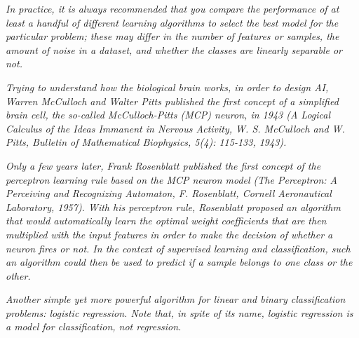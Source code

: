 \textit{In practice, it is always recommended that you compare the performance of at least a handful of different learning algorithms to select the best model for the particular problem; these may differ in the number of features or samples, the amount of noise in a dataset, and whether the classes are linearly separable or not.}

\textit{Trying to understand how the biological brain works, in order to design AI, Warren McCulloch and Walter Pitts published the first concept of a simplified brain cell, the so-called McCulloch-Pitts (MCP) neuron, in 1943 (A Logical Calculus of the Ideas Immanent in Nervous Activity, W. S. McCulloch and W. Pitts, Bulletin of Mathematical Biophysics, 5(4): 115-133, 1943).}

\textit{Only a few years later, Frank Rosenblatt published the first concept of the perceptron learning rule based on the MCP neuron model (The Perceptron: A Perceiving and Recognizing Automaton, F. Rosenblatt, Cornell Aeronautical Laboratory, 1957). With his perceptron rule, Rosenblatt proposed an algorithm that would automatically learn the optimal weight coefficients that are then multiplied with the input features in order to make the decision of whether a neuron fires or not. In the context of supervised learning and classification, such an algorithm could then be used to predict if a sample belongs to one class or the other.}

\textit{Another simple yet more powerful algorithm for linear and binary classification problems: logistic regression. Note that, in spite of its name, logistic regression is a model for classification, not regression.}


